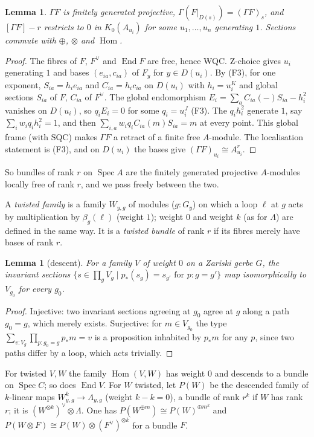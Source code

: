 \documentclass[11pt]{amsart}
\newtheorem{lemma}[theorem]{Lemma}
\theoremstyle{definition}
\theoremstyle{remark}
\newcommand{\Spec}{\operatorname{Spec}}
\newcommand{\Hom}{\operatorname{Hom}}
\newcommand{\End}{\operatorname{End}}
\begin{document}
\begin{lemma}\label{l:affine}
$\Gamma F$ is finitely generated projective, $\Gamma(F|_{D(s)})=(\Gamma
F)_s$, and $[\Gamma F]-r$ restricts to $0$ in $K_0(A_{u_i})$ for some
$u_1,\dots,u_n$ generating $1$. Sections commute with $\oplus$, $\otimes$
and $\Hom$.
\end{lemma}
\begin{proof}
The fibres of $F$, $F^\vee$ and $\End F$ are free, hence WQC. Z-choice
gives $u_i$ generating $1$ and bases $(e_{ia},c_{ia})$ of $F_y$ for $y\in
D(u_i)$. By (F3), for one exponent, $S_{ia}=h_ie_{ia}$ and
$C_{ia}=h_ic_{ia}$ on $D(u_i)$ with $h_i=u_i^K$ and global sections
$S_{ia}$ of $F$, $C_{ia}$ of $F^\vee$. The global endomorphism
$E_i=\sum_aC_{ia}(-)S_{ia}-h_i^2$ vanishes on $D(u_i)$, so $q_iE_i=0$ for
some $q_i=u_i^J$ (F3). The $q_ih_i^2$ generate $1$, say
$\sum_iw_iq_ih_i^2=1$, and then $\sum_{i,a}w_iq_iC_{ia}(m)S_{ia}=m$ at
every point. This global frame (with SQC) makes $\Gamma F$ a retract of a
finite free $A$-module. The localisation statement is (F3), and on
$D(u_i)$ the bases give $(\Gamma F)_{u_i}\cong A_{u_i}^r$.
\end{proof}

So bundles of rank $r$ on $\Spec A$ are the finitely generated projective
$A$-modules locally free of rank $r$, and we pass freely between the two.

A \emph{twisted family} is a family $W_{y,g}$ of modules ($g:G_y$) on
which a loop $\ell$ at $g$ acts by multiplication by $\beta_g(\ell)$
(weight $1$); weight $0$ and weight $k$ (as for $\Lambda$) are defined in
the same way. It is a \emph{twisted bundle} of rank $r$ if its fibres
merely have bases of rank $r$.

\begin{lemma}[descent]\label{l:descent}
For a family $V$ of weight $0$ on a Zariski gerbe $G$, the invariant
sections $\{s\in\prod_gV_g\mid p_*(s_g)=s_{g'}\text{ for }p:g=g'\}$ map
isomorphically to $V_{g_0}$ for every $g_0$.
\end{lemma}
\begin{proof}
Injective: two invariant sections agreeing at $g_0$ agree at $g$ along a
path $g_0=g$, which merely exists. Surjective: for $m\in V_{g_0}$ the type
$\sum_{v:V_g}\prod_{p:g_0=g}p_*m=v$ is a proposition inhabited by $p_*m$
for any $p$, since two paths differ by a loop, which acts trivially.
\end{proof}

For twisted $V,W$ the family $\Hom(V,W)$ has weight $0$ and descends to a
bundle on $\Spec C$; so does $\End V$. For $W$ twisted, let $P(W)$ be the
descended family of $k$-linear maps $W_{y,g}^k\to\Lambda_{y,g}$ (weight
$k-k=0$), a bundle of rank $r^k$ if $W$ has rank $r$; it is
$(W^{\otimes k})^\vee\otimes\Lambda$. One has $P(W^{\oplus m})\cong
P(W)^{\oplus m^k}$ and $P(W\otimes F)\cong P(W)\otimes(F^\vee)^{\otimes k}$
for a bundle $F$.
\end{document}

